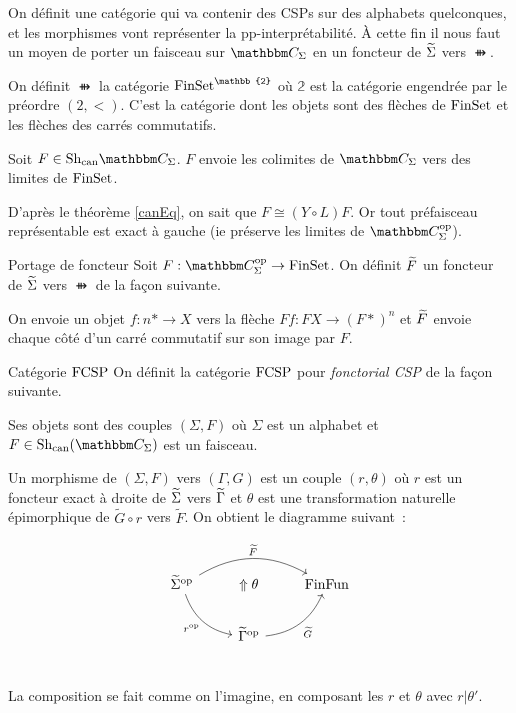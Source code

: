 
On définit une catégorie qui va contenir des CSPs sur des alphabets quelconques,
et les morphismes vont représenter la pp-interprétabilité. À cette fin il nous
faut un moyen de porter un faisceau sur $\C_\Sigma$ en un foncteur de $\widetilde{\Sigma}$
vers $\ffun$.

\begin{defi}{\ffun}
    On définit $\ffun$ la catégorie $\fset^\mathbb{2}$ où $\mathbb{2}$ est la
    catégorie engendrée par le préordre $(2,<)$. C'est la catégorie dont les
    objets sont des flèches de $\text{FinSet}$ et les flèches des carrés commutatifs.
\end{defi}

\begin{lem}
    Soit $F\in\shc{\C_\Sigma}$. $F$ envoie les colimites de $\C_\Sigma$ vers
    des limites de $\text{FinSet}$.
\end{lem}

\begin{pv}
    D'après le théorème \ref{canEq}, on sait que $F\cong (Y\circ L) F$. Or tout préfaisceau
    représentable est exact à gauche (ie préserve les limites de $\C_\Sigma^\op$).
\end{pv}

\begin{defi}{Portage de foncteur}
    Soit $F:\C_\Sigma^\op\rightarrow\fset$. On définit $\widetilde{F}$ un foncteur de
    $\widetilde{\Sigma}$ vers $\ffun$ de la façon suivante.

    On envoie un objet $f:n\ast\rightarrow X$ vers la flèche
    $F f :FX\rightarrow(F\ast)^n$ et $\widetilde{F}$ envoie chaque côté d'un
    carré commutatif sur son image par $F$.
\end{defi}

\begin{defi}{Catégorie $\text{FCSP}$}
    On définit la catégorie $\text{FCSP}$ pour \emph{fonctorial CSP} de la façon suivante.

    Ses objets sont des couples $(\Sigma, F)$ où $\Sigma$ est un alphabet et
    $F\in\shc(\C_\Sigma)$ est un faisceau.

    Un morphisme de $(\Sigma,F)$ vers $(\Gamma,G)$ est un couple $(r,\theta)$ où $r$
    est un foncteur exact à droite de $\widetilde{\Sigma}$ vers $\widetilde{\Gamma}$ et $\theta$ est
    une transformation naturelle épimorphique de $\tilde{G}\circ r$ vers $\tilde{F}$.
    On obtient le diagramme suivant~:

    \[\begin{tikzcd}
        \tsigma^\op\arrow[dr, bend right, swap, "r^\op"]\arrow[rr, bend left, "\tf"]
            & \Uparrow\theta
            & \ffun \\
        & \tgamma^\op\arrow[ur, bend right, swap, "\tg"] \\
    \end{tikzcd}\]

    La composition se fait comme on l'imagine, en composant les $r$ et
    $\theta$ avec $r|\theta'$.
\end{defi}

